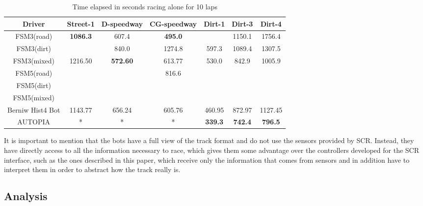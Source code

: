 	
	\begin{table*}[t]
	\renewcommand{\arraystretch}{1.3}
	\caption{Time elapsed in seconds racing alone for 10 laps}
	\label{tbl:time raced}
	\centering
	\begin{tabular}{c||c||c||c||c||c||c}
	\hline
	\bfseries Driver & \bfseries Street-1 & \bfseries D-speedway & \bfseries CG-speedway & \bfseries Dirt-1 & \bfseries Dirt-3 & \bfseries Dirt-4 \\ 
	\hline
		\hline FSM3(road) & \textbf{1086.3} & 607.4 & \textbf{495.0} & \textdagger & 1150.1 & 1756.4 \\
	\hline FSM3(dirt) & \textdagger & 840.0 & 1274.8 & 597.3 & 1089.4 & 1307.5 \\
	\hline FSM3(mixed) & 1216.50 & \textbf{572.60} & 613.77& 530.0 & 842.9 & 1005.9 \\
	\hline FSM5(road) & \textdagger & \textdagger & 816.6 & \textdagger & \textdagger & \textdagger \\
	\hline FSM5(dirt) & \textdagger & \textdagger & \textdagger & \textdagger &	\textdagger & \textdagger \\
	\hline FSM5(mixed) & \textdagger & \textdagger & \textdagger & \textdagger & \textdagger & \textdagger \\
	\hline Berniw Hist4 Bot & 1143.77 & 656.24 & 605.76 & 460.95 & 872.97 & 1127.45 \\
	\hline AUTOPIA & * & * & * & \textbf{339.3} & \textbf{742.4} & \textbf{796.5} \\
	\hline 
	\end{tabular} 
	\end{table*}
	
	It is important to mention that the bots have a full view of the track format and do not use the sensors provided by SCR. Instead, they have directly access to all the information necessary to race, which gives them some advantage over the controllers developed for the SCR interface, such as the ones described in this paper, which receive only the information that comes from sensors and in addition have to interpret them in order to abstract how the track really is. 
	
\subsection{Analysis} \label{subsec:Analysis}
	
